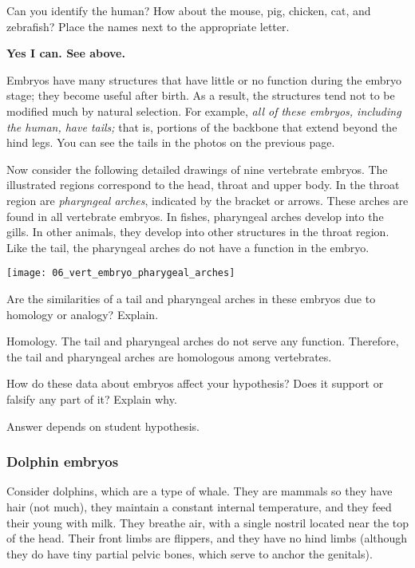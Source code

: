 \documentclass[12pt, hidelinks]{exam}
\newcommand*\AnswerBox[2]{%
    \parbox[t][#1]{0.92\textwidth}{%
    \begin{solution}#2\end{solution}}
}
\begin{document}
\begin{questions}

\question
Can you identify the human? How about the
mouse, pig, chicken, cat, and zebrafish? Place the names next to the appropriate letter. 

\ifprintanswers\textbf{Yes I can. See above.}\fi

\newpage

Embryos have many structures that have little or no
function during the embryo stage; they become useful after birth. As a result, 
the structures tend not to be modified much by natural selection. For example,
\emph{all of these embryos, including the human, have tails;} that is,
portions of the backbone that extend beyond the hind legs. You can see the tails 
in the photos on the previous page.

Now consider the following detailed drawings of nine vertebrate embryos.
The illustrated regions correspond to the head, throat and upper body.
In the throat region are \emph{pharyngeal arches}, indicated by the
bracket or arrows. These arches are found in all vertebrate embryos. 
In fishes, pharyngeal arches develop into the gills. In other animals, 
they develop into other structures in the throat region. Like the tail, the pharyngeal
arches do not have a function in the embryo.

\begin{center}
	\texttt{[image: 06\_vert\_embryo\_pharygeal\_arches]}
\end{center}

\question[3]
Are the similarities of a tail and pharyngeal arches in these embryos due to homology or analogy? Explain.

\AnswerBox{5\baselineskip}{Homology. The tail and pharyngeal arches do not serve any function. Therefore,
the tail and pharyngeal arches are homologous among vertebrates.}

\question[2]
How do these data about embryos affect your hypothesis? Does it support or
falsify any part of it? Explain why.

\AnswerBox{3\baselineskip}{Answer depends on student hypothesis.}


\subsubsection*{Dolphin embryos}

Consider dolphins, which are a type of whale. They are mammals so they have hair (not much),
they maintain a constant internal temperature, and they feed their young with
milk. They breathe air, with a single nostril located near the top of
the head. Their front limbs are flippers, and they have no hind limbs
(although they do have tiny partial pelvic bones, which serve to anchor
the genitals).


\end{questions}
\end{document}
